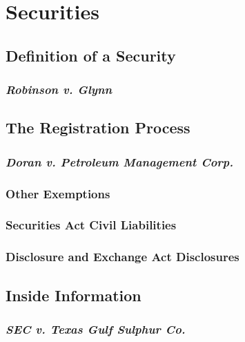 \section{Securities}

\subsection{Definition of a Security}


\subsubsection{\emph{Robinson v. Glynn}}


\subsection{The Registration Process}


\subsubsection{\emph{Doran v. Petroleum Management Corp.}}


\subsubsection{Other Exemptions}


\subsubsection{Securities Act Civil Liabilities}


\subsubsection{Disclosure and Exchange Act Disclosures}


\subsection{Inside Information}

\subsubsection{\emph{SEC v. Texas Gulf Sulphur Co.}}

